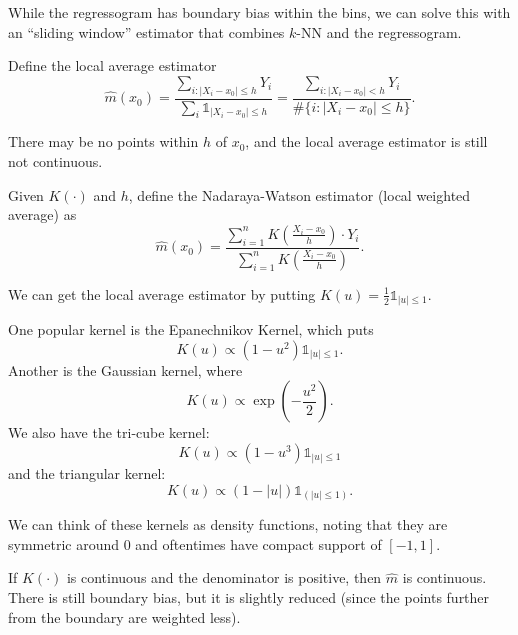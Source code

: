 While the regressogram has boundary bias within the bins, we can solve this with an ``sliding window'' estimator that combines $k$-NN and the regressogram.

\begin{definition}
	Define the local average estimator \[
		\hat{m}(x_0) = \frac{\sum_{i: \left| X_i - x_0 \right| \le h} Y_i}{\sum_{i} \mathds{1}_{\left| X_i - x_0 \right| \le h}} = \frac{\sum_{i: \left| X_i - x_0 \right| < h} Y_i}{\# \{i: \left| X_i - x_0 \right| \le h\}}
	.\] 
\end{definition}

There may be no points within $h$ of $x_0$, and the local average estimator is still not continuous.

\begin{definition}
	Given $K(\cdot )$ and $h$, define the Nadaraya-Watson estimator (local weighted average) as \[
		\hat{m}(x_0) = \frac{\sum\limits_{i=1}^{n} K\left( \frac{X_i - x_0}{h} \right) \cdot  Y_i}{\sum\limits_{i=1}^{n} K\left( \frac{X_i - x_0}{h} \right)}
	.\] 

	We can get the local average estimator by putting $K(u) = \frac{1}{2} \mathds{1}_{\left| u  \right|\le 1}$.
\end{definition}

\begin{example}	One popular kernel is the Epanechnikov Kernel, which puts \[
		K(u) \propto \left( 1- u^2 \right) \mathds{1}_{\left| u \right| \le 1}
	.\] Another is the Gaussian kernel, where \[
		K(u) \propto \operatorname{exp}\left(- \frac{u^2}{2}\right)
	.\] We also have the tri-cube kernel: \[
		K(u) \propto (1-u^3)\mathds{1}_{\left| u \right| \le 1}
	\] and the triangular kernel: \[
		K(u) \propto \left( 1-\left| u \right| \right)\mathds{1}_{\left( \left| u \right| \le 1 \right)}
	.\] 

	We can think of these kernels as density functions, noting that they are symmetric around $0$ and oftentimes have compact support of $[-1,1]$.
\end{example}

\begin{remark}	If $K(\cdot )$ is continuous and the denominator is positive, then $\hat{m}$ is continuous. There is still boundary bias, but it is slightly reduced (since the points further from the boundary are weighted less).
\end{remark}

